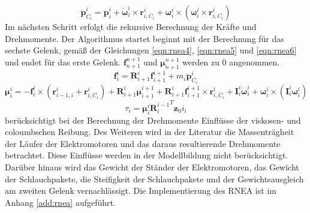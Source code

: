 %
\begin{equation}
	\label{eqn:rnea3}
	\ddot{\bm{p}}^i_{C_i} = \ddot{\bm{p}}^{i}_{i} + \dot{\bm{\omega}}^{i}_{i} \times \bm{r}^{i}_{i,C_i} + {\bm{\omega}}^{i}_{i} \times \left(  {\bm{\omega}}^{i}_{i} \times \bm{r}^{i}_{i,C_i} \right)
\end{equation}
%
Im nächsten Schritt erfolgt die rekursive Berechnung der Kräfte und Drehmomente. Der Algorithmus startet beginnt mit der Berechnung für das sechste Gelenk, gemäß der Gleichungen \ref{eqn:rnea4}, \ref{eqn:rnea5} und \ref{eqn:rnea6} und endet für das erste Gelenk. $\bm{f}^{n+1}_{n+1}$ und $\bm{\mu}^{n+1}_{n+1}$ werden zu 0 angenommen. 
%
\begin{equation}
	\label{eqn:rnea4}
	\bm{f}^{i}_{i} = \bm{R}^{i}_{i+1} \bm{f}^{i+1}_{i+1} + m_i\ddot{\bm{p}}^{i}_{C_i}
\end{equation}
%
\begin{equation}
	\label{eqn:rnea5}
	\bm{\mu}^{i}_{i} = -\bm{f}^{i}_{i} \times \left( \bm{r}^{i}_{i-1,i} + \bm{r}^{i}_{i,C_i} \right) + \bm{R}^{i}_{i+1} \bm{\mu}^{i+1}_{i+1} + \bm{R}^{i}_{i+1} \bm{f}^{i+1}_{i+1} \times \bm{r}^{i}_{i,C_i} + \bm{I}^{i}_{i} \dot{\bm{\omega}}^{i}_{i} + {\bm{\omega}}^{i}_{i} \times (\bm{I}^{i}_{i}{\bm{\omega}}^{i}_{i})
\end{equation}
\begin{equation}
	\label{eqn:rnea6}
	\tau_i = \bm{\mu}^{i}_{i} {\bm{R}^{i-1}_{i}}^T \bm{z}_0 i_i
\end{equation}
%
\autocite[S.~287~f.]{Grimble.2009} berücksichtigt bei der Berechnung der Drehmomente Einflüsse der viskosen- und coloumbschen Reibung. Des Weiteren wird in der Literatur die  Massenträgheit der Läufer der Elektromotoren und das daraus resultierende Drehmomente betrachtet. Diese Einflüsse werden in der Modellbildung nicht berücksichtigt. Darüber hinaus wird das Gewicht der Ständer der Elektromotoren, das Gewicht der Schlauchpakete, die Steifigkeit der Schlauchpakete und der Gewichtsausgleich am zweiten Gelenk vernachlässigt. 
%
Die Implementierung des RNEA ist im Anhang \ref{add:rnea} aufgeführt.	
%

